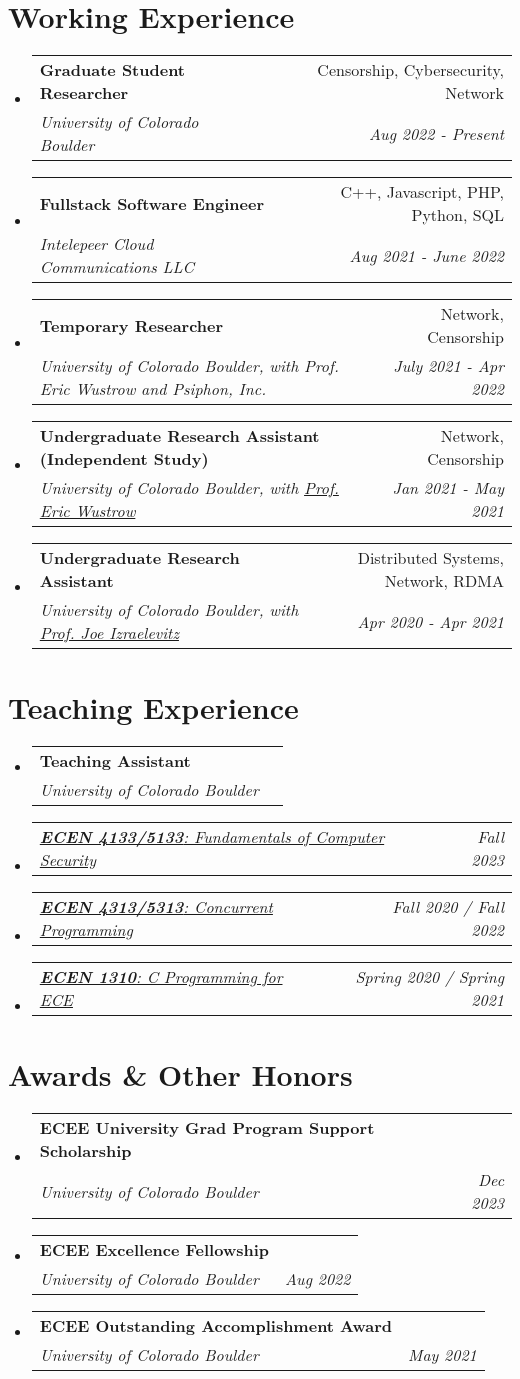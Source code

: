 \documentclass[letterpaper,11pt]{article}
\makeatletter
\newcommand{\resumeSubheading}[4]{
  \vspace{-2pt}\item
    \begin{tabular*}{0.97\textwidth}[t]{l@{\extracolsep{\fill}}r}
      \textbf{#1} & #2 \\
      \textit{\small#3} & \textit{\small #4} \\
    \end{tabular*}\vspace{-7pt}
}
\newcommand{\resumeSubSubheading}[2]{
    \item
    \begin{tabular*}{0.97\textwidth}{l@{\extracolsep{\fill}}r}
      \textit{\small#1} & \textit{\small #2} \\
    \end{tabular*}\vspace{-7pt}
}
\newcommand{\resumeSubHeadingListStart}{\begin{itemize}[leftmargin=0.15in, label={}]}
\newcommand{\resumeSubHeadingListEnd}{\end{itemize}}
\makeatother
\begin{document}
\section{Working Experience}
\resumeSubHeadingListStart
\resumeSubheading
{Graduate Student Researcher}{Censorship, Cybersecurity, Network}
{University of Colorado Boulder}{Aug 2022 - Present}
\resumeSubheading
{Fullstack Software Engineer}{C++, Javascript, PHP, Python, SQL}
{Intelepeer Cloud Communications LLC}{Aug 2021 - June 2022}
\resumeSubheading
{Temporary Researcher}{Network, Censorship}
{University of Colorado Boulder, with Prof. Eric Wustrow and Psiphon, Inc.}{July 2021 - Apr 2022}
\resumeSubheading
{Undergraduate Research Assistant (Independent Study)}{Network, Censorship}
{University of Colorado Boulder, with 
\href{https://www.colorado.edu/ecee/eric-wustrow}{Prof. Eric Wustrow}
}{Jan 2021 - May 2021}
\resumeSubheading
{Undergraduate Research Assistant}{Distributed Systems, Network, RDMA}
{University of Colorado Boulder, with 
\href{https://www.colorado.edu/ecee/joseph-joe-izraelevitz}{Prof. Joe Izraelevitz}
}{Apr 2020 - Apr 2021}
\resumeSubHeadingListEnd

\section{Teaching Experience}
\resumeSubHeadingListStart
\resumeSubheading
{Teaching Assistant}{}
{University of Colorado Boulder}{}
\resumeSubSubheading
{
  \em\href{https://experts.colorado.edu/display/coursename_ECEN-5133}{\textbf{ECEN 4133/5133}: Fundamentals of Computer Security}
}{Fall 2023}
\resumeSubSubheading
{
  \em\href{https://experts.colorado.edu/display/coursename_ECEN-5313}{\textbf{ECEN 4313/5313}: Concurrent Programming}
}{Fall 2020 / Fall 2022}
\resumeSubSubheading
{
  \em\href{https://experts.colorado.edu/display/coursename_ECEN-1310}{\textbf{ECEN 1310}: C Programming for ECE}
}{Spring 2020 / Spring 2021}
\resumeSubHeadingListEnd
\vspace{1pt}

\section{Awards \& Other Honors}
\resumeSubHeadingListStart
\resumeSubheading
{ECEE University Grad Program Support Scholarship}{}
{University of Colorado Boulder}{Dec 2023}
\resumeSubheading
{ECEE Excellence Fellowship}{}
{University of Colorado Boulder}{Aug 2022}
\resumeSubheading
{ECEE Outstanding Accomplishment Award}{}
{University of Colorado Boulder}{May 2021}
\resumeSubHeadingListEnd
\vspace{1pt}

\end{document}
